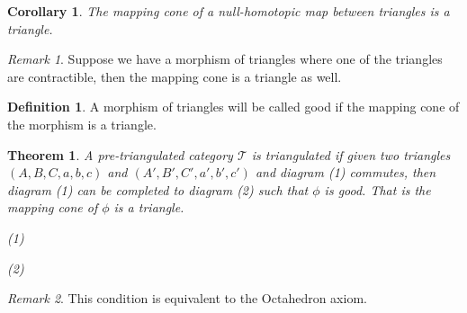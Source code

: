 \documentclass[12pt]{article}
\newtheorem{theorem}{Theorem}[section]
\newtheorem{corollary}{Corollary}[theorem]
\theoremstyle{definition}
\newtheorem{definition}{Definition}[section]
\theoremstyle{remark}
\newtheorem*{remark}{Remark}
\begin{document}
            \begin{corollary}
                The mapping cone of a null-homotopic map between  triangles is a triangle.
            \end{corollary}

            \begin{remark}
                Suppose we have a morphism of triangles where one of the triangles are contractible, then the mapping cone is a triangle as well.
            \end{remark}

            \begin{definition}
                A morphism of triangles will be called good if the mapping cone of the morphism is a triangle.
            \end{definition}

            \begin{theorem}
                A pre-triangulated category $\mathcal{T}$ is triangulated if given two triangles $(A,B,C,a,b,c)$ and $(A',B',C',a',b',c')$ and diagram (1) commutes, then diagram (1) can be completed to diagram (2) such that $\phi$ is good. That is the mapping cone of $\phi$ is a triangle.
                \begin{center}
                    (1)
                    (2)
                \end{center}
            \end{theorem}

            \begin{remark}
                This condition is equivalent to the Octahedron axiom.
            \end{remark}
\end{document}
